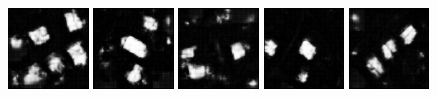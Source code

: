 \documentclass[12pt,a4paper]{article}
\begin{document}
    
    \begin{figure}[p]
        \centering

        \includegraphics[width=0.19\textwidth]{images/data_onlydida/predictions/535}
        \includegraphics[width=0.19\textwidth]{images/data_onlydida/predictions/537}
        \includegraphics[width=0.19\textwidth]{images/data_onlydida/predictions/539}
        \includegraphics[width=0.19\textwidth]{images/data_onlydida/predictions/551}
        \includegraphics[width=0.19\textwidth]{images/data_onlydida/predictions/553}
        

\end{figure}
\end{document}
